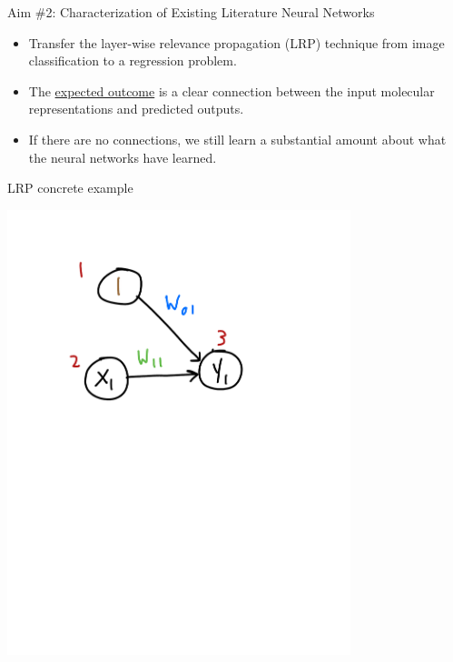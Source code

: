 \documentclass[xetex,compress]{beamer}
\begin{document}

\begin{frame}{Aim \#2: Characterization of Existing Literature Neural Networks}
  \begin{itemize}
  \item Transfer the layer-wise relevance propagation (LRP) technique from image classification to a regression problem.
  \item The \underline{expected outcome} is a clear connection between the input molecular representations and predicted outputs.
  \item If there are no connections, we still learn a substantial amount about what the neural networks have learned.
  \end{itemize}
\end{frame}


\begin{frame}{LRP concrete example}
  \begin{center}
    \includegraphics[width=0.75\textwidth]{./figures/lr_nn_4.pdf}
  \end{center}
\end{frame}
\end{document}
